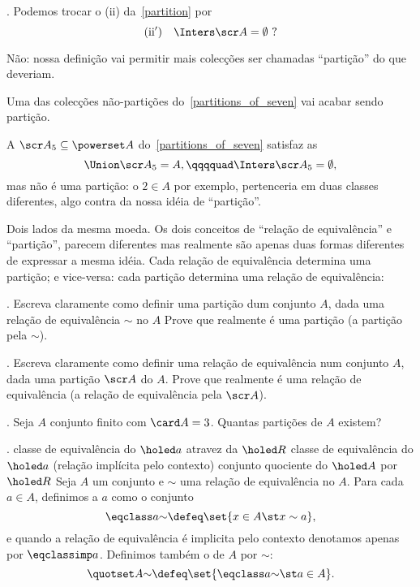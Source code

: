 {\endexercise

\exercise.
Podemos trocar o (ii) da~\ref{partition} por
$$
\text{(ii$'$)}\quad\Inters \scr A = \emptyset\  ?
$$

\hint
Não: nossa definição vai permitir mais colecções ser chamadas ``partição'' do que deveriam.

\hint
Uma das colecções não-partições do~\ref{partitions_of_seven} vai
acabar sendo partição.

\solution
A $\scr A_5\subseteq\powerset A$ do~\ref{partitions_of_seven} satisfaz as
$$
\Union \scr A_5 = A,
\qqqquad
\Inters \scr A_5 = \emptyset,
$$
mas não é uma partição: o $2\in A$ por exemplo, pertenceria em duas classes
diferentes, algo contra da nossa idéia de ``partição''.

\endexercise

\note Dois lados da mesma moeda.
Os dois conceitos de ``relação de equivalência'' e ``partição'',
parecem diferentes mas realmente são apenas duas formas diferentes de
expressar a mesma idéia.
Cada relação de equivalência determina uma partição;
e vice-versa: cada partição determina uma relação de equivalência:

\exercise.
Escreva claramente como definir uma partição dum conjunto $A$,
dada uma relação de equivalência $\sim$ no $A$
Prove que realmente é uma partição
(a partição  pela $\sim$).

\endexercise

\exercise.
Escreva claramente como definir uma relação de equivalência num conjunto $A$,
dada uma partição $\scr A$ do $A$.
Prove que realmente é uma relação de equivalência
(a relação de equivalência  pela $\scr A$).

\endexercise

\exercise.
\label{how_many_partitions_on_3}%
Seja $A$ conjunto finito com $\card A = 3$.
Quantas partições de $A$ existem?

\endexercise

.
\label{equivalent_class}%
%
 {classe de equivalência do $\holed a$ atravez da $\holed R$}%
 {classe de equivalência do $\holed a$ (relação implícita pelo contexto)}%
 {conjunto quociente do $\holed A$ por $\holed R$}%
Seja $A$ um conjunto e $\sim$ uma relação de equivalência no $A$.
Para cada $a\in A$, definimos a  $a$
como o conjunto
$$
\eqclass a {\sim} \defeq \set {x\in A \st x\sim a},
$$
e quando a relação de equivalência é implicita pelo contexto
denotamos apenas por $\eqclassimp a$.
Definimos também o  de $A$ por $\sim$:
$$
\quotset A {\sim} \defeq \set {\eqclass a {\sim} \st a \in A }.
$$

}
